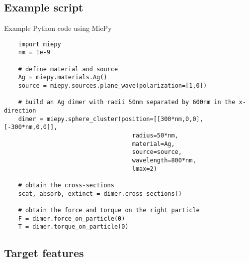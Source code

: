 \documentclass[11pt]{article}
\begin{document}
\subsection{Example script}

Example Python code using MiePy
\begin{lstlisting}
    import miepy
    nm = 1e-9

    # define material and source
    Ag = miepy.materials.Ag()
    source = miepy.sources.plane_wave(polarization=[1,0])

    # build an Ag dimer with radii 50nm separated by 600nm in the x-direction
    dimer = miepy.sphere_cluster(position=[[300*nm,0,0], [-300*nm,0,0]],
                                    radius=50*nm,
                                    material=Ag,
                                    source=source,
                                    wavelength=800*nm,
                                    lmax=2)

    # obtain the cross-sections
    scat, absorb, extinct = dimer.cross_sections()

    # obtain the force and torque on the right particle
    F = dimer.force_on_particle(0)
    T = dimer.torque_on_particle(0)
\end{lstlisting}

\subsection{Target features}
\end{document}
